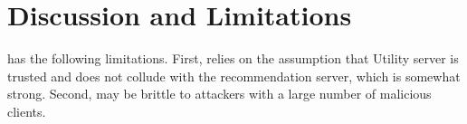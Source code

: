 \section{Discussion and Limitations}
\label{sec:discussion}

\Sys has the following limitations. First, \Sys relies on the assumption that Utility server is trusted and does not collude with the recommendation server, which is somewhat strong. Second, \Sys may be brittle to attackers with a large number of malicious clients. 